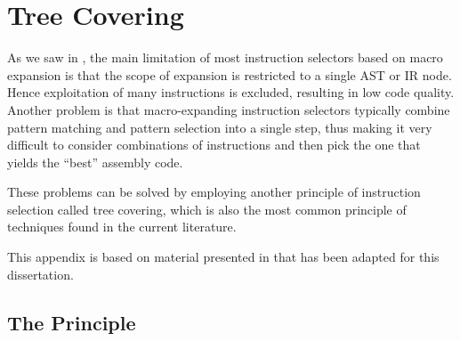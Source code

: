 %

\chapter{Tree Covering}


As we saw in , the main limitation of most
\glspl{instruction selector} based on \gls{macro expansion} is that the scope of
expansion is restricted to a single \gls{AST} or \gls{IR} \gls{node}.
%
Hence exploitation of many \glspl{instruction} is excluded, resulting in low
code quality.
%
Another problem is that \gls{macro}-expanding \glspl{instruction selector}
typically combine \gls{pattern matching} and \gls{pattern selection} into a
single step, thus making it very difficult to consider combinations of
\glspl{instruction} and then pick the one that yields the ``best'' \gls{assembly
  code}.

These problems can be solved by employing another \gls{principle} of
\gls{instruction selection} called \gls{tree covering}, which is also the most
common \gls{principle} of techniques found in the current literature.

This appendix is based on material presented in
\cite[Chap.]{HjortBlindell:2016:Survey} that has been adapted for
this dissertation.


\section{The Principle}


